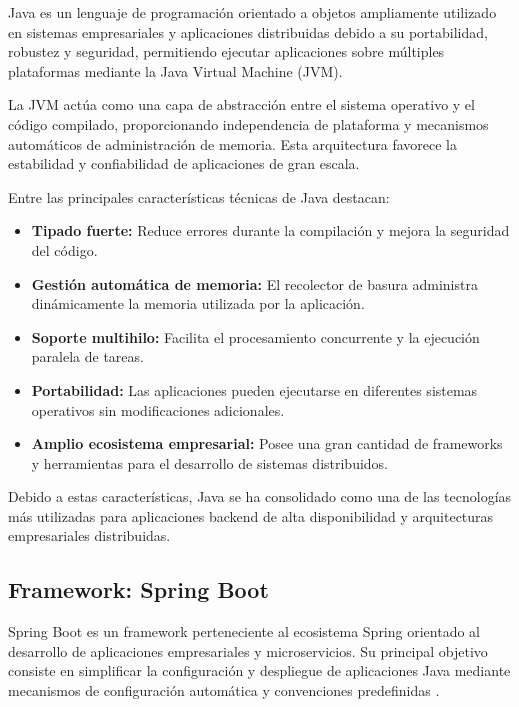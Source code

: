 \documentclass[12pt, oneside, letterpaper]{book}
\begin{document}
Java es un lenguaje de programación orientado a objetos ampliamente utilizado en sistemas empresariales y aplicaciones distribuidas debido a su portabilidad, robustez y seguridad, permitiendo ejecutar aplicaciones sobre múltiples plataformas mediante la Java Virtual Machine (JVM).

La JVM actúa como una capa de abstracción entre el sistema operativo y el código compilado, proporcionando independencia de plataforma y mecanismos automáticos de administración de memoria. Esta arquitectura favorece la estabilidad y confiabilidad de aplicaciones de gran escala.

Entre las principales características técnicas de Java destacan:

\begin{itemize}
\item \textbf{Tipado fuerte:} Reduce errores durante la compilación y mejora la seguridad del código.

\item \textbf{Gestión automática de memoria:} El recolector de basura administra dinámicamente la memoria utilizada por la aplicación.

\item \textbf{Soporte multihilo:} Facilita el procesamiento concurrente y la ejecución paralela de tareas.

\item \textbf{Portabilidad:} Las aplicaciones pueden ejecutarse en diferentes sistemas operativos sin modificaciones adicionales.

\item \textbf{Amplio ecosistema empresarial:} Posee una gran cantidad de frameworks y herramientas para el desarrollo de sistemas distribuidos.
\end{itemize}

Debido a estas características, Java se ha consolidado como una de las tecnologías más utilizadas para aplicaciones backend de alta disponibilidad y arquitecturas empresariales distribuidas.

\subsection{Framework: Spring Boot}

Spring Boot es un framework perteneciente al ecosistema Spring orientado al desarrollo de aplicaciones empresariales y microservicios. Su principal objetivo consiste en simplificar la configuración y despliegue de aplicaciones Java mediante mecanismos de configuración automática y convenciones predefinidas \cite{38}.
\end{document}
